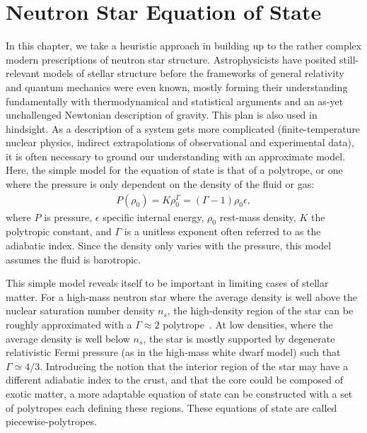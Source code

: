 \chapter{Neutron Star Equation of State}
\label{chap:chapter-2}

In this chapter, we take a heuristic approach in building up to the rather complex modern prescriptions of neutron star structure. 
Astrophysicists have posited still-relevant models of stellar structure before the frameworks of general relativity and quantum mechanics were even known, mostly forming their understanding fundamentally with thermodynamical and statistical arguments and an as-yet unchallenged Newtonian description of gravity.
This plan is also used in hindsight.
As a description of a system gets more complicated (finite-temperature nuclear physics, indirect extrapolations of observational and experimental data), it is often necessary to ground our understanding with an approximate model.
Here, the simple model for the equation of state is that of a polytrope, or one where the pressure is only dependent on the density of the fluid or gas:
\begin{align}
P(\rho_0) = K \rho_0^\Gamma = (\Gamma -  1) \rho_0 \epsilon,
\end{align}
where $P$ is pressure, $\epsilon$ specific internal energy, $\rho_0$ rest-mass density, $K$ the polytropic constant, and $\Gamma$ is a unitless exponent often referred to as the adiabatic index.
Since the density only varies with the pressure, this model assumes the fluid is barotropic.

This simple model reveals itself to be important in limiting cases of stellar matter.  
For a high-mass neutron star where the average density is well above the nuclear saturation number density $n_s$, the high-density region of the star can be roughly approximated with a $\Gamma \approx 2$ polytrope~\cite{lattimer2016equation}.  
At low densities, where the average density is well below $n_s$, the star is mostly supported by degenerate relativistic Fermi pressure (as in the high-mass white dwarf model) such that $\Gamma \simeq 4/3$.
Introducing the notion that the interior region of the star may have a different adiabatic index to the crust, and that the core could be composed of exotic matter, a more adaptable equation of state can be constructed with a set of polytropes each defining these regions.  
These equations of state are called piecewise-polytropes.  

